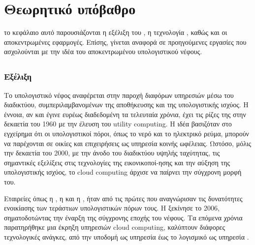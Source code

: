 \chapter{Θεωρητικό υπόβαθρο}
το κεφάλαιο αυτό παρουσιάζονται η εξέλιξη του 
, η τεχνολογία , καθώς και οι
αποκεντρωμένες εφαρμογές. Επίσης, γίνεται αναφορά σε προηγούμενες εργασίες 
που ασχολούνται με την ιδέα του αποκεντρωμένου υπολογιστικού νέφους.

\section{}
\subsection{Εξέλιξη }
Το υπολογιστικό νέφος αναφέρεται στην παροχή διαφόρων υπηρεσιών μέσω του 
διαδικτύου, συμπεριλαμβανομένων της αποθήκευσης και της υπολογιστικής ισχύος. 
Η έννοια, αν και έγινε ευρέως διαδεδομένη τα τελευταία χρόνια, έχει τις ρίζες 
της στην δεκαετία του 1960 με την έλευση του utility computing. Η ιδέα 
βασιζόταν στο εγχείρημα ότι οι υπολογιστικοί πόροι, όπως το νερό και το 
ηλεκτρικό ρεύμα, μπορούν να παρέχονται σε οικίες και επιχειρήσεις ως υπηρεσία 
κοινής ωφέλειας. Ωστόσο, μόλις την δεκαετία του 2000, με την άνοδο του 
διαδικτύου υψηλής ταχύτητας, τις σημαντικές εξελίξεις στις τεχνολογίες
της εικονικοποί-ησης  και την αύξηση της υπολογιστικής ισχύος, 
το cloud computing άρχισε να παίρνει την σύγχρονη μορφή του.

Εταιρείες όπως η , η  και η , ήταν από τις 
πρώτες που αναγνώρισαν τις δυνατότητες ενοικίασης των τεράστιων υπολογιστικών 
πόρων τους. Η  ξεκίνησε το 2006, σηματοδοτώντας 
την έναρξη της σύγχρονης εποχής του νέφους. Τα επόμενα χρόνια παρατηρήθηκε 
μια έκρηξη υπηρεσιών cloud computing, καλύπτουν διάφορες τεχνολογικές ανάγκες, 
από την υποδομή ως υπηρεσία  έως το 
λογισμικό ως υπηρεσία .

